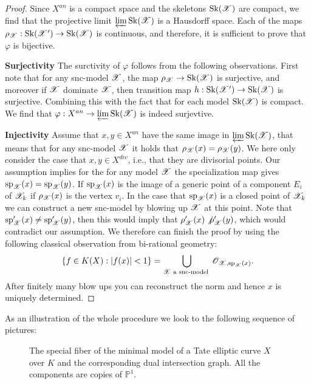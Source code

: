 \begin{proof}
Since $X^{an}$ is a compact space and the skeletons $\operatorname{Sk}(\mathcal{X})$ are compact, we find that the projective limit $\varprojlim \operatorname{Sk}(\mathcal{X})$ is a Hausdorff space. Each of the maps $\rho_{\mathcal{X}}:\operatorname{Sk}(\mathcal{X}')\to\operatorname{Sk}(\mathcal{X})$ is continuous, and therefore, it is sufficient to prove that $\varphi$ is bijective. 

\textbf{Surjectivity} The surctivity of $\varphi$ follows from the following observations. First note that for any snc-model $\mathcal{X}$, the map $\rho_{\mathcal{X}}\to\operatorname{Sk}(\mathcal{X})$ is surjective, and moreover if $\mathcal{X}$ dominate $\mathcal{X}$, then transition map $h:\operatorname{Sk}(\mathcal{X}')\to\operatorname{Sk}(\mathcal{X})$ is surjective. Combining this with the fact that for each model $\operatorname{Sk}(\mathcal{X})$ is compact. We  find that $\varphi:X^{an}\to \varprojlim\operatorname{Sk}(\mathcal{X})$ is indeed surjevtive.

\textbf{Injectivity} Assume that $x,y\in X^{an}$ have the same image in $\varprojlim\operatorname{Sk}(\mathcal{X})$, that means that for any snc-model $\mathcal{X}$ it holds that $\rho_{\mathcal{X}}(x)=\rho_{\mathcal{X}}(y)$. We here only consider the case that $x,y\in X^{div}$, i.e., that they are divisorial points. Our assumption implies for the for any model $\mathcal{X}$ the specialization map gives $\operatorname{sp}_{\mathcal{X}}(x)=\operatorname{sp}_{\mathcal{X}}(y)$. If $\operatorname{sp}_{\mathcal{X}}(x)$ is the image of a generic point of a component $E_i$ of $\mathcal{X}_k$ if $\rho_{\mathcal{X}}(x)$ is the vertex $v_i$. In the case that $\operatorname{sp}_{\mathcal{X}}(x)$ is a closed point of $\mathcal{X}_k$ we can construct a new snc-model by blowing up $\mathcal{X}$ at this point. Note that $\operatorname{sp}_{\mathcal{X}}'(x)\not=\operatorname{sp}_{\mathcal{X}}'(y)$, then this would imply that $\rho_{\mathcal{X}}'(x)\not\rho_{\mathcal{X}}'(y)$, which would contradict our assumption. We therefore can finish the proof by using  
the following classical observation from bi-rational geometry:
\[\{f\in K(X):|f(x)|<1\}=\bigcup\limits_{\mathcal{X}\text{ a snc-model }}\mathcal O_{\mathcal{X},\operatorname{sp}_{\mathcal{X}}(x)}.\]
After finitely many blow ups you can reconstruct the norm and hence $x$ is uniquely determined.
\end{proof}

As an illustration of the whole procedure we look to the following sequence of pictures:

\begin{center}
\begin{figure}[h]
\caption{ The special fiber of the minimal model of a Tate elliptic curve $X$ over $K$ and the corresponding dual intersection graph. All the components are copies of $\mathbb P^1$. }
\end{figure}
\end{center}

